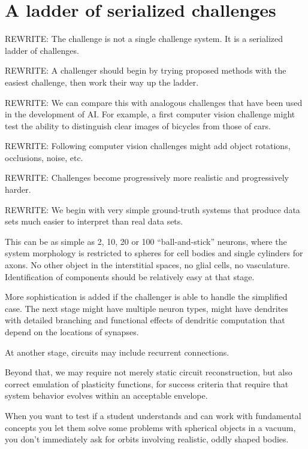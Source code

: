 \documentclass{ldr-article}
\begin{document}
\section{A ladder of serialized challenges}

\alert{REWRITE:} The challenge is not a single challenge system. It is a serialized ladder of challenges.

\alert{REWRITE:} A challenger should begin by trying proposed methods with the easiest challenge, then work their way up the ladder.

\alert{REWRITE:} We can compare this with analogous challenges that have been used in the development of AI. For example, a first computer vision challenge might test the ability to distinguish clear images of bicycles from those of cars.

\alert{REWRITE:} Following computer vision challenges might add object rotations, occlusions, noise, etc.

\alert{REWRITE:} Challenges become progressively more realistic and progressively harder.

\alert{REWRITE:} We begin with very simple ground-truth systems that produce data sets much easier to interpret than real data sets.

This can be as simple as 2, 10, 20 or 100 “ball-and-stick” neurons, where the system morphology is restricted to spheres for cell bodies and single cylinders for axons. No other object in the interstitial spaces, no glial cells, no vasculature. Identification of components should be relatively easy at that stage.

More sophistication is added if the challenger is able to handle the simplified case. The next stage might have multiple neuron types, might have dendrites with detailed branching and functional effects of dendritic computation that depend on the locations of synapses.

At another stage, circuits may include recurrent connections.

Beyond that, we may require not merely static circuit reconstruction, but also correct emulation of plasticity functions, for success criteria that require that system behavior evolves within an acceptable envelope.

When you want to test if a student understands and can work with fundamental concepts you let them solve some problems with spherical objects in a vacuum, you don’t immediately ask for orbits involving realistic, oddly shaped bodies.
\end{document}
